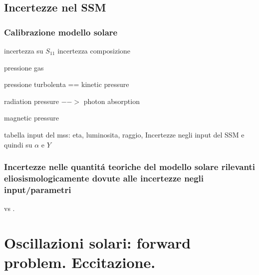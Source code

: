 \documentclass[../main.tex]{subfiles}
\begin{document}
\begin{refsection}

\nocite{*}

\section{Incertezze nel SSM}

\begingroup
\let\clearpage\relax

\printbibliography[filter=ssmunphys,keyword={rev},title={\textcolor{ochre}{Biblio about: ''Incertezze nei parametri e nella fisica usata nel SSM''}}]
\printbibliography[filter=ssmunphys,notkeyword={rev},title={\textcolor{ochre}{Other refs about: ''Incertezze nei parametri e nella fisica usata nel SSM''}}]
\endgroup

\subsection{Calibrazione modello solare}

incertezza su $S_{11}$
incertezza composizione
\begin{itemize*}
\item pressione gas
\item pressione turbolenta == kinetic pressure
\item radiation pressure $-->$ photon absorption
\item magnetic pressure
\end{itemize*}
tabella input del mss: eta, luminosita, raggio,
Incertezze negli input del SSM e quindi su $\alpha$ e $Y$

\subsection{Incertezze nelle quantit\'a teoriche del modello solare rilevanti eliosismologicamente dovute alle incertezze negli input/parametri}

\cite{bahcall200610} vs \cite{boothroyd2003our}.

\end{refsection}


{\let\clearpage\relax
\chapter{Oscillazioni solari: forward problem. Eccitazione.}}
\PartialToc
\end{document}
